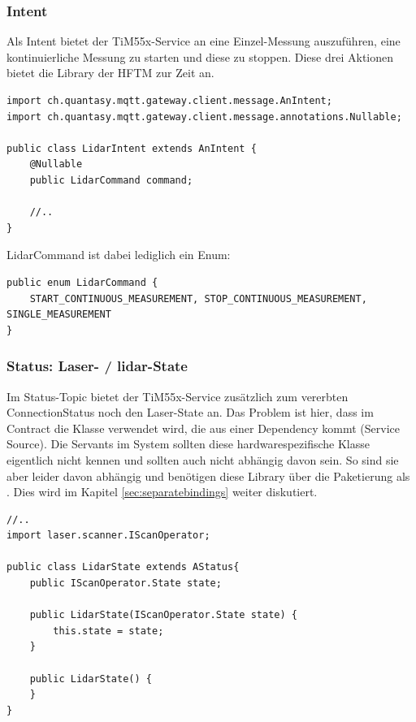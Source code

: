 \subsubsection{Intent}
Als Intent bietet der TiM55x-Service an eine Einzel-Messung auszuführen, eine kontinuierliche Messung zu starten und diese zu stoppen. Diese drei Aktionen bietet die Library der HFTM zur Zeit an.
\begin{lstlisting}[caption={TiM55x-Service - Struktur des 'LidarIntent'},label={lst:tim55x-intent}]
import ch.quantasy.mqtt.gateway.client.message.AnIntent;
import ch.quantasy.mqtt.gateway.client.message.annotations.Nullable;

public class LidarIntent extends AnIntent {
    @Nullable
    public LidarCommand command;
    
    //..
}
\end{lstlisting}
LidarCommand ist dabei lediglich ein Enum:
\begin{lstlisting}[caption={TiM55x-Service - Struktur des 'LidarCommand'},label={lst:tim55x-lidarCommand}]
public enum LidarCommand {
    START_CONTINUOUS_MEASUREMENT, STOP_CONTINUOUS_MEASUREMENT, SINGLE_MEASUREMENT
}
\end{lstlisting}

\subsubsection{Status: Laser- / \acrshort{lidar}-State}
Im Status-Topic bietet der TiM55x-Service zusätzlich zum vererbten ConnectionStatus noch den Laser-State an. Das Problem ist hier, dass im Contract die Klasse  verwendet wird, die aus einer Dependency kommt (Service Source). Die Servants im System sollten diese hardwarespezifische Klasse eigentlich nicht kennen und sollten auch nicht abhängig davon sein. So sind sie aber leider davon abhängig und benötigen diese Library über die Paketierung als . Dies wird im Kapitel \ref{sec:separatebindings} weiter diskutiert.
\begin{lstlisting}[caption={TiM55x-Service - Struktur des 'LidarState'},label={lst:tim55x-lidarState}]
//..
import laser.scanner.IScanOperator;

public class LidarState extends AStatus{
    public IScanOperator.State state;

    public LidarState(IScanOperator.State state) {
        this.state = state;
    }

    public LidarState() {
    }
}
\end{lstlisting}

